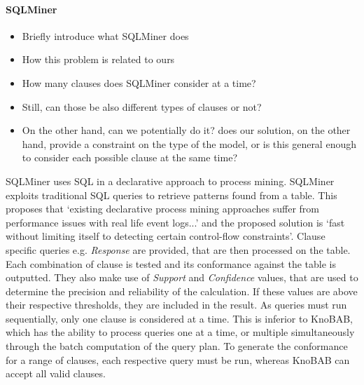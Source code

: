 \paragraph*{SQLMiner} \cite{Schonig15, SchonigRCJM16}
\begin{itemize}
	\item{Briefly introduce what SQLMiner does}
	\item{How this problem is related to ours}
	\item{How many clauses does SQLMiner consider at a time?}
	\item{Still, can those be also different types of clauses or not?}
	\item{On the other hand, can we potentially do it? does our solution, on the other hand, provide a constraint on the type of the model, or is this general enough to consider each possible clause at the same time?}
\end{itemize}
SQLMiner \cite{Schonig15} uses SQL in a declarative approach to process mining. SQLMiner  exploits traditional SQL queries to retrieve patterns found from a table. This proposes that `existing declarative process mining approaches suffer from performance issues with real life event logs...' and the proposed solution is `fast without limiting itself to detecting certain control-flow constraints'. Clause specific queries e.g. \emph{Response} are provided, that are then processed on the table. Each combination of clause is tested and its conformance against the table is outputted. They also make use of \emph{Support} and \emph{Confidence} values, that are used to determine the precision and reliability of the calculation. If these values are above their respective thresholds, they are included in the result. As queries must run sequentially, only one clause is considered at a time. This is inferior to KnoBAB, which has the ability to process queries one at a time, or multiple simultaneously through the batch computation of the query plan. To generate the conformance for a range of clauses, each respective query must be run, whereas KnoBAB can accept all valid clauses. 

